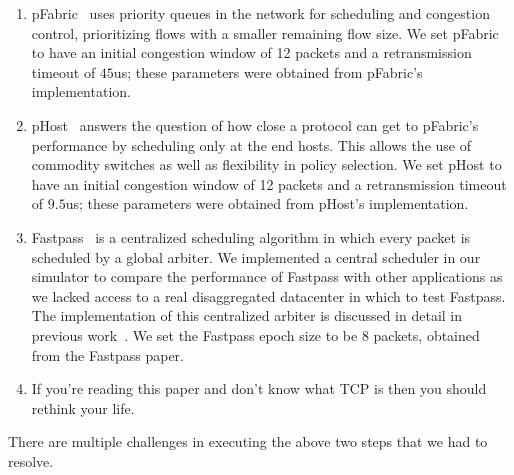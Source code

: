 \begin{enumerate}
\item {} pFabric~\cite{pfabric} uses priority queues in the network for scheduling and congestion control, prioritizing flows with a smaller remaining flow size. We set pFabric to have an initial congestion window of 12 packets  and a retransmission timeout of $45$us; these parameters were obtained from pFabric's implementation.
\item {} pHost~\cite{phost} answers the question of how close a protocol can get to pFabric's performance by scheduling only at the end hosts. This allows the use of commodity switches as well as flexibility in policy selection. We set pHost to have an initial congestion window of 12 packets  and a retransmission timeout of $9.5$us; these parameters were obtained from pHost's implementation.
\item {} Fastpass~\cite{fastpass} is a centralized scheduling algorithm in which every packet is scheduled by a global arbiter. We implemented a central scheduler in our simulator to compare the performance of Fastpass with other applications as we lacked access to a real disaggregated datacenter in which to test Fastpass. The implementation of this centralized arbiter is discussed in detail in previous work~\cite{phost}. We set the Fastpass epoch size to be 8 packets, obtained from the Fastpass paper.
\item {} If you're reading this paper and don't know what TCP is then you should rethink your life. 
\end{enumerate}

There are multiple challenges in executing the above two steps that we had to resolve.

